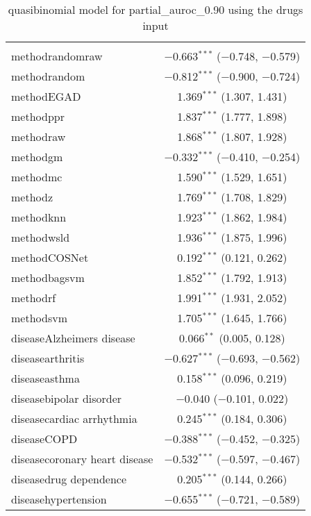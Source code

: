
\begin{table}[!htbp] \centering 
  \caption{quasibinomial model for partial_auroc_0.90 using the drugs input} 
  \label{} 
\begin{tabular}{@{\extracolsep{5pt}}lc} 
\\[-1.8ex]\hline 
\hline \\[-1.8ex] 
 methodrandomraw & $-$0.663$^{***}$ ($-$0.748, $-$0.579) \\ 
  methodrandom & $-$0.812$^{***}$ ($-$0.900, $-$0.724) \\ 
  methodEGAD & 1.369$^{***}$ (1.307, 1.431) \\ 
  methodppr & 1.837$^{***}$ (1.777, 1.898) \\ 
  methodraw & 1.868$^{***}$ (1.807, 1.928) \\ 
  methodgm & $-$0.332$^{***}$ ($-$0.410, $-$0.254) \\ 
  methodmc & 1.590$^{***}$ (1.529, 1.651) \\ 
  methodz & 1.769$^{***}$ (1.708, 1.829) \\ 
  methodknn & 1.923$^{***}$ (1.862, 1.984) \\ 
  methodwsld & 1.936$^{***}$ (1.875, 1.996) \\ 
  methodCOSNet & 0.192$^{***}$ (0.121, 0.262) \\ 
  methodbagsvm & 1.852$^{***}$ (1.792, 1.913) \\ 
  methodrf & 1.991$^{***}$ (1.931, 2.052) \\ 
  methodsvm & 1.705$^{***}$ (1.645, 1.766) \\ 
  diseaseAlzheimers disease & 0.066$^{**}$ (0.005, 0.128) \\ 
  diseasearthritis & $-$0.627$^{***}$ ($-$0.693, $-$0.562) \\ 
  diseaseasthma & 0.158$^{***}$ (0.096, 0.219) \\ 
  diseasebipolar disorder & $-$0.040 ($-$0.101, 0.022) \\ 
  diseasecardiac arrhythmia & 0.245$^{***}$ (0.184, 0.306) \\ 
  diseaseCOPD & $-$0.388$^{***}$ ($-$0.452, $-$0.325) \\ 
  diseasecoronary heart disease & $-$0.532$^{***}$ ($-$0.597, $-$0.467) \\ 
  diseasedrug dependence & 0.205$^{***}$ (0.144, 0.266) \\ 
  diseasehypertension & $-$0.655$^{***}$ ($-$0.721, $-$0.589) \\ 

\end{tabular}
\end{table}
